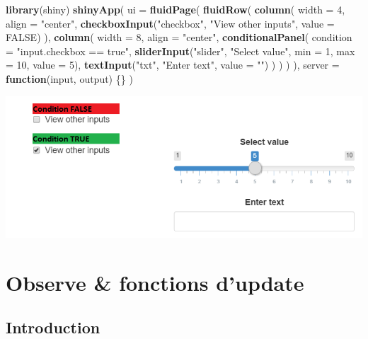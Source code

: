 \documentclass[]{article}
\newenvironment{Shaded}{\begin{snugshade}}{\end{snugshade}}
\newcommand{\KeywordTok}[1]{\textcolor[rgb]{0.13,0.29,0.53}{\textbf{#1}}}
\newcommand{\DataTypeTok}[1]{\textcolor[rgb]{0.13,0.29,0.53}{#1}}
\newcommand{\DecValTok}[1]{\textcolor[rgb]{0.00,0.00,0.81}{#1}}
\newcommand{\StringTok}[1]{\textcolor[rgb]{0.31,0.60,0.02}{#1}}
\newcommand{\OtherTok}[1]{\textcolor[rgb]{0.56,0.35,0.01}{#1}}
\newcommand{\ControlFlowTok}[1]{\textcolor[rgb]{0.13,0.29,0.53}{\textbf{#1}}}
\newcommand{\NormalTok}[1]{#1}
\begin{document}
\begin{Shaded}
\begin{Highlighting}[]
\KeywordTok{library}\NormalTok{(shiny)}
\KeywordTok{shinyApp}\NormalTok{(}
  \DataTypeTok{ui =} \KeywordTok{fluidPage}\NormalTok{(}
    \KeywordTok{fluidRow}\NormalTok{(}
      \KeywordTok{column}\NormalTok{(}
        \DataTypeTok{width =} \DecValTok{4}\NormalTok{,}
        \DataTypeTok{align =} \StringTok{"center"}\NormalTok{,}
        \KeywordTok{checkboxInput}\NormalTok{(}\StringTok{"checkbox"}\NormalTok{, }\StringTok{"View other inputs"}\NormalTok{, }\DataTypeTok{value =} \OtherTok{FALSE}\NormalTok{)}
\NormalTok{      ),}
      \KeywordTok{column}\NormalTok{(}
        \DataTypeTok{width =} \DecValTok{8}\NormalTok{,}
        \DataTypeTok{align =} \StringTok{"center"}\NormalTok{,}
        \KeywordTok{conditionalPanel}\NormalTok{(}
          \DataTypeTok{condition =} \StringTok{"input.checkbox == true"}\NormalTok{, }
          \KeywordTok{sliderInput}\NormalTok{(}\StringTok{"slider"}\NormalTok{, }\StringTok{"Select value"}\NormalTok{, }\DataTypeTok{min =} \DecValTok{1}\NormalTok{, }\DataTypeTok{max =} \DecValTok{10}\NormalTok{, }\DataTypeTok{value =} \DecValTok{5}\NormalTok{),}
          \KeywordTok{textInput}\NormalTok{(}\StringTok{"txt"}\NormalTok{, }\StringTok{"Enter text"}\NormalTok{, }\DataTypeTok{value =} \StringTok{""}\NormalTok{)}
\NormalTok{        )}
\NormalTok{      )}
\NormalTok{    )}
\NormalTok{  ),}
  \DataTypeTok{server =} \ControlFlowTok{function}\NormalTok{(input, output) \{\}}
\NormalTok{)}
\end{Highlighting}
\end{Shaded}

\includegraphics{img/cond1.png}

\section{Observe \& fonctions d'update}\label{observe-fonctions-dupdate}

\subsection{Introduction}\label{introduction-1}
\end{document}
